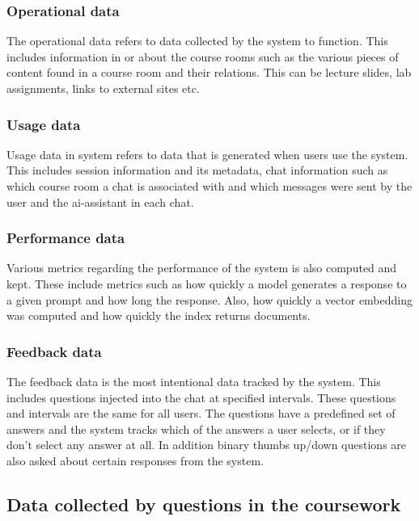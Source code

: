 \subsubsection{Operational data}


The operational data refers to data collected by the system to function. This includes information in or about the course rooms such as the various pieces of content found in a course room and their relations. This can be lecture slides, lab assignments, links to external sites etc.


\subsubsection{Usage data}


Usage data in system refers to data that is generated when users use the system. This includes session information and its metadata, chat information such as which course room a chat is associated with and which messages were sent by the user and the ai-assistant in each chat.


\subsubsection{Performance data}


Various metrics regarding the performance of the system is also computed and kept. These include metrics such as how quickly a model generates a response to a given prompt and how long the response. Also, how quickly a vector embedding was computed and how quickly the index returns documents.


\subsubsection{Feedback data}
\label{sec:method_feedback_data}




The feedback data is the most intentional data tracked by the system. This includes questions injected into the chat at specified intervals. These questions and intervals are the same for all users. The questions have a predefined set of answers and the system tracks which of the answers a user selects, or if they don’t select any answer at all. In addition binary thumbs up/down questions are also asked about certain responses from the system.


\subsection{Data collected by questions in the coursework}

